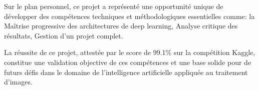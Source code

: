 \begin{flushleft}
Sur le plan personnel, ce projet a représenté une opportunité unique de développer des compétences techniques et méthodologiques essentielles comme: la Maîtrise progressive des architectures de deep learning, Analyse critique des résultats, Gestion d'un projet complet.

\bigskip
La réussite de ce projet, attestée par le score de 99.1\% sur la compétition Kaggle, constitue une validation objective de ces compétences et une base solide pour de futurs défis dans le domaine de l'intelligence artificielle appliquée au traitement d'images.

\end{flushleft}
